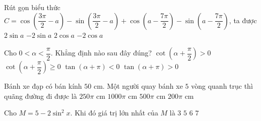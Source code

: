\begin{ex}%
Rút gọn biểu thức $C=\cos \left(\dfrac{3\pi}{2}-a\right)- \sin \left(\dfrac{3\pi}{2}-a\right) + \cos \left(a- \dfrac{7\pi}{2}\right)- \sin \left(a- \dfrac{7\pi}{2}\right) $, ta được
\choice
{$2\sin a $}
{\True $-2\sin a $}
{$2\cos a $}
{$-2\cos a $}
\end{ex}

\begin{ex}%
Cho $0<\alpha <\dfrac{\pi }{2}$. Khẳng định nào sau đây đúng?
\choice
{$\cot \left(\alpha +\dfrac{\pi }{2}\right)>0$}
{$\cot \left(\alpha +\dfrac{\pi }{2}\right)\ge 0$}
{$\tan \left(\alpha +\pi\right)<0$}
{\True $\tan \left(\alpha +\pi\right)>0$}
\end{ex}

\begin{ex}%
Bánh xe đạp có bán kính $50$ cm. Một người quay bánh xe $5$ vòng quanh trục thì quãng đường đi được là
\choice
{$250\pi$ cm}
{$1000\pi$ cm}
{\True $500\pi$ cm}
{$200\pi$ cm}
\end{ex}

\begin{ex}%
Cho $M=5-2\sin^2 x $. Khi đó giá trị lớn nhất của $M $ là
\choice
{$3 $}
{\True $5 $}
{$6 $}
{$7 $}
\end{ex}

